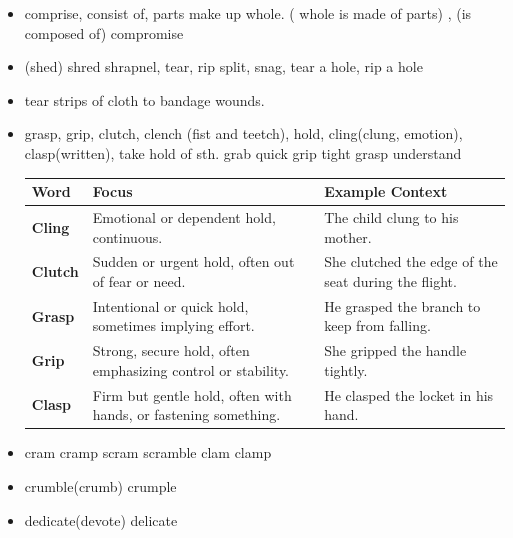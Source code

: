 \documentclass[a4paper,11pt,twoside]{book}
\begin{document}
\begin{itemize}
	I strained my back trying to restrain the dog. 
	
	\item comprise, consist of, parts make up whole. ( whole is made of parts) , (is composed of) compromise 
	
	\item (shed) shred shrapnel, tear, rip split, snag, tear a hole, rip a hole
	
	\item tear strips of cloth to bandage wounds. 
	
	\item grasp, grip, clutch, clench (fist and teetch),  hold, cling(clung, emotion), clasp(written), take hold of sth.
	grab quick
	grip tight
	grasp understand
	
	\begin{tabular}{|l|p{6cm}|p{6cm}|}
		\hline
		\textbf{Word}   & \textbf{Focus}                                                                                 & \textbf{Example Context}                                      \\ \hline
		\textbf{Cling}  & Emotional or dependent hold, continuous.                                                  & The child clung to his mother.                        \\ \hline
		\textbf{Clutch} & Sudden or urgent hold, often out of fear or need.                                         & She clutched the edge of the seat during the flight.  \\ \hline
		\textbf{Grasp}  & Intentional or quick hold, sometimes implying effort.                                     & He grasped the branch to keep from falling.           \\ \hline
		\textbf{Grip}   & Strong, secure hold, often emphasizing control or stability.                              & She gripped the handle tightly.                       \\ \hline
		\textbf{Clasp}  & Firm but gentle hold, often with hands, or fastening something.                          & He clasped the locket in his hand.                    \\ \hline
	\end{tabular}
	
	\item cram cramp scram scramble clam clamp
	
	\item crumble(crumb) crumple
	
	\item dedicate(devote) delicate
	

\end{itemize}
\end{document}
